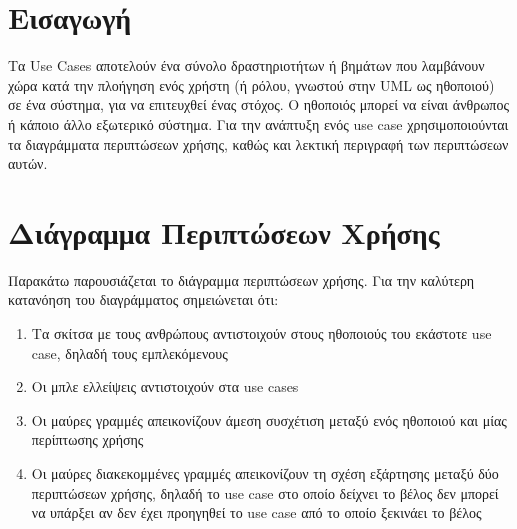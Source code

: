 \documentclass{article}
\begin{document}
{
  \hypersetup{linkcolor=black}
  \tableofcontents
}

\section{Εισαγωγή}

Τα Use Cases αποτελούν ένα σύνολο δραστηριοτήτων ή βημάτων που λαμβάνουν χώρα κατά την πλοήγηση ενός χρήστη (ή ρόλου, γνωστού στην UML ως ηθοποιού) σε ένα σύστημα, για να επιτευχθεί ένας στόχος. Ο ηθοποιός μπορεί να είναι άνθρωπος ή κάποιο άλλο εξωτερικό σύστημα. 
Για την ανάπτυξη ενός use case χρησιμοποιούνται τα διαγράμματα περιπτώσεων χρήσης, καθώς και λεκτική περιγραφή των περιπτώσεων αυτών.

\section{Διάγραμμα Περιπτώσεων Χρήσης}

Παρακάτω παρουσιάζεται το διάγραμμα περιπτώσεων χρήσης. Για την καλύτερη κατανόηση του διαγράμματος σημειώνεται ότι:

\begin{enumerate}
  \item Τα σκίτσα με τους ανθρώπους αντιστοιχούν στους ηθοποιούς του εκάστοτε use case, δηλαδή τους εμπλεκόμενους
  \item Οι μπλε ελλείψεις αντιστοιχούν στα use cases
  \item Οι μαύρες γραμμές απεικονίζουν άμεση συσχέτιση μεταξύ ενός ηθοποιού και μίας περίπτωσης χρήσης
  \item Οι μαύρες διακεκομμένες γραμμές απεικονίζουν τη σχέση εξάρτησης μεταξύ δύο περιπτώσεων χρήσης, δηλαδή το use case στο οποίο δείχνει το βέλος δεν μπορεί να υπάρξει αν δεν έχει προηγηθεί το use case από το οποίο ξεκινάει το βέλος  
\end{enumerate}
\end{document}

